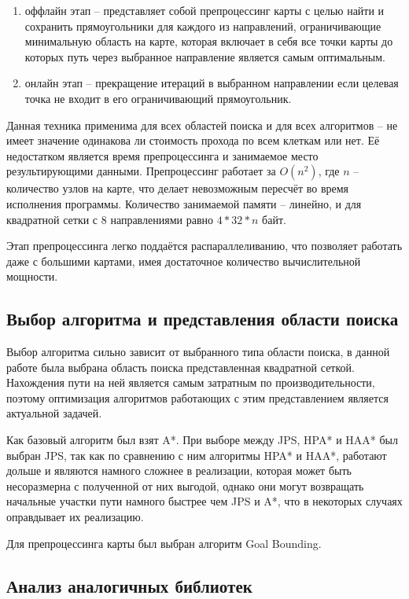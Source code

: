 \begin{enumerate}
	\item оффлайн этап -- представляет собой препроцессинг карты с целью найти и сохранить прямоугольники для каждого из направлений, ограничивающие минимальную область на карте, которая включает в себя все точки карты до которых путь через выбранное направление является самым оптимальным.
	\item онлайн этап -- прекращение итераций в выбранном направлении если целевая точка не входит в его ограничивающий прямоугольник.
\end{enumerate}
 
Данная техника применима для всех областей поиска и для всех алгоритмов -- не имеет значение одинакова ли стоимость прохода по всем клеткам или нет. Её недостатком является время препроцессинга и занимаемое место результирующими данными. Препроцессинг работает за $O(n^2)$, где $n$ -- количество узлов на карте, что делает невозможным пересчёт во время исполнения программы. Количество занимаемой памяти -- линейно, и для квадратной сетки с 8 направлениями равно $4 * 32 * n$ байт.

Этап препроцессинга легко поддаётся распараллеливанию, что позволяет работать даже с большими картами, имея достаточное количество вычислительной мощности. 

\subsection{Выбор алгоритма и представления области поиска}

Выбор алгоритма сильно зависит от выбранного типа области поиска, в данной работе была выбрана область поиска представленная квадратной сеткой. Нахождения пути на ней является самым затратным по производительности, поэтому оптимизация алгоритмов работающих с этим представлением является актуальной задачей. 

Как базовый алгоритм был взят A*. При выборе между JPS, HPA* и HAA* был выбран JPS, так как по сравнению с ним алгоритмы HPA* и HAA*, работают дольше и являются намного сложнее в реализации, которая может быть несоразмерна с полученной от них выгодой, однако они могут возвращать начальные участки пути намного быстрее чем JPS и A*, что в некоторых случаях оправдывает их реализацию.  

Для препроцессинга карты был выбран алгоритм Goal Bounding.

\subsection{Анализ аналогичных библиотек}

